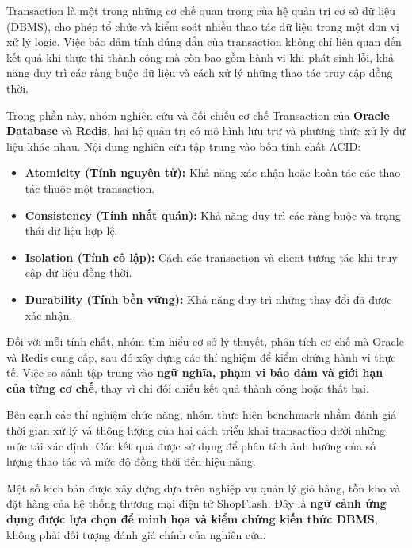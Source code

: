 \label{sec:tx-1}
\label{sec:tx-1-1}
Transaction là một trong những cơ chế quan trọng của hệ quản trị cơ sở dữ liệu (DBMS), cho phép tổ chức và kiểm soát nhiều thao tác dữ liệu trong một đơn vị xử lý logic. Việc bảo đảm tính đúng đắn của transaction không chỉ liên quan đến kết quả khi thực thi thành công mà còn bao gồm hành vi khi phát sinh lỗi, khả năng duy trì các ràng buộc dữ liệu và cách xử lý những thao tác truy cập đồng thời.

Trong phần này, nhóm nghiên cứu và đối chiếu cơ chế Transaction của \textbf{Oracle Database} và \textbf{Redis}, hai hệ quản trị có mô hình lưu trữ và phương thức xử lý dữ liệu khác nhau. Nội dung nghiên cứu tập trung vào bốn tính chất ACID:

\begin{itemize}[leftmargin=*,itemsep=2pt,topsep=4pt]
\item
\textbf{Atomicity (Tính nguyên tử):} Khả năng xác nhận hoặc hoàn tác các thao tác thuộc một transaction.

\item
\textbf{Consistency (Tính nhất quán):} Khả năng duy trì các ràng buộc và trạng thái dữ liệu hợp lệ.

\item
\textbf{Isolation (Tính cô lập):} Cách các transaction và client tương tác khi truy cập dữ liệu đồng thời.

\item
\textbf{Durability (Tính bền vững):} Khả năng duy trì những thay đổi đã được xác nhận.

\end{itemize}
Đối với mỗi tính chất, nhóm tìm hiểu cơ sở lý thuyết, phân tích cơ chế mà Oracle và Redis cung cấp, sau đó xây dựng các thí nghiệm để kiểm chứng hành vi thực tế. Việc so sánh tập trung vào \textbf{ngữ nghĩa, phạm vi bảo đảm và giới hạn của từng cơ chế}, thay vì chỉ đối chiếu kết quả thành công hoặc thất bại.

Bên cạnh các thí nghiệm chức năng, nhóm thực hiện benchmark nhằm đánh giá thời gian xử lý và thông lượng của hai cách triển khai transaction dưới những mức tải xác định. Các kết quả được sử dụng để phân tích ảnh hưởng của số lượng thao tác và mức độ đồng thời đến hiệu năng.

Một số kịch bản được xây dựng dựa trên nghiệp vụ quản lý giỏ hàng, tồn kho và đặt hàng của hệ thống thương mại điện tử ShopFlash. Đây là \textbf{ngữ cảnh ứng dụng được lựa chọn để minh họa và kiểm chứng kiến thức DBMS}, không phải đối tượng đánh giá chính của nghiên cứu.

